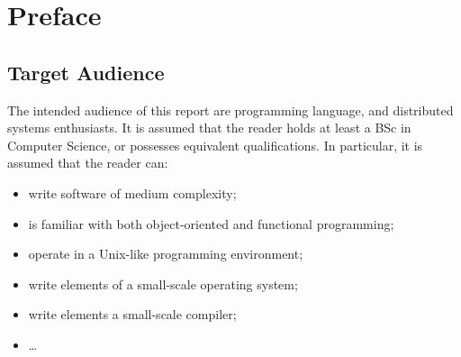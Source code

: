 \chapter*{Preface}



\section{Target Audience}

The intended audience of this report are programming language, and
distributed systems enthusiasts. It is assumed that the reader holds
at least a BSc in Computer Science, or possesses equivalent
qualifications. In particular, it is assumed that the reader can:

\begin{itemize}

\item write software of medium complexity;

\item is familiar with both object-oriented and functional
programming;

\item operate in a Unix-like programming environment;

\item write elements of a small-scale operating system;

\item write elements a small-scale compiler;

\item \ldots

\end{itemize}
